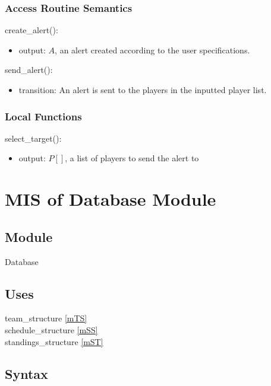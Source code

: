 \documentclass[12pt, titlepage]{article}
\begin{document}
\subsubsection{Access Routine Semantics}

\noindent create\_alert():
\begin{itemize}
\item output: $A$, an alert created according to the user specifications.
\end{itemize}

\noindent send\_alert():
\begin{itemize}
\item transition: An alert is sent to the players in the inputted player list.
\end{itemize}

\subsubsection{Local Functions}

\noindent select\_target():
\begin{itemize}
\item output: $P[]$, a list of players to send the alert to
\end{itemize}

\newpage

\section{MIS of Database Module} \label{mDB}



\subsection{Module}

Database

\subsection{Uses}

team\_structure \ref{mTS} \\
schedule\_structure \ref{mSS} \\
standings\_structure \ref{mST}

\subsection{Syntax}
\end{document}
